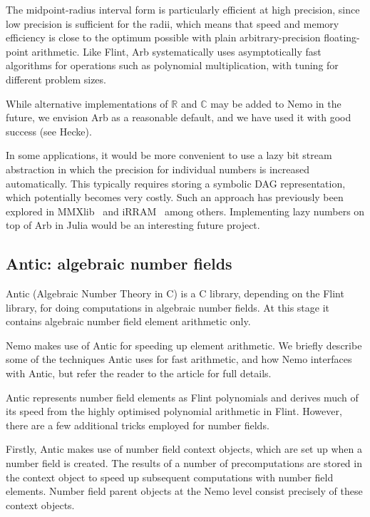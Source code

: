 \documentclass{sig-alternate-05-2015}
\begin{document}
The midpoint-radius interval form is particularly efficient
at high precision,
since low precision is sufficient for the radii, which means that
speed and memory efficiency is close to the optimum possible
with plain arbitrary-precision floating-point arithmetic.
Like Flint, Arb systematically uses asymptotically fast algorithms
for operations such as polynomial multiplication, with tuning
for different problem sizes.

While alternative implementations of $\mathbb{R}$ and $\mathbb{C}$
may be added to Nemo in the future, we envision Arb as a reasonable default,
and we have used it with good success (see Hecke).

In some applications, it would be more convenient to use a lazy
bit stream abstraction in which the precision for individual
numbers is increased automatically.
This typically requires storing a symbolic DAG representation,
which potentially becomes very costly.
Such an approach has previously been explored in MMXlib~\cite{mmxlibeffective} and iRRAM~\cite{irram}
among others.
Implementing lazy numbers on top of Arb in Julia
would be an interesting future project.

\subsection{Antic: algebraic number fields}

Antic (Algebraic Number Theory in C) is a C library, depending on the Flint library, for
doing computations in algebraic number fields. At this stage it contains algebraic number
field element arithmetic only.

Nemo makes use of Antic for speeding up element arithmetic. We briefly describe some
of the techniques Antic uses for fast arithmetic, and how Nemo interfaces with Antic, but
refer the reader to the article \cite{anticrundbrief} for full details.

Antic represents number field elements as Flint polynomials and derives much of its speed
from the highly optimised polynomial arithmetic in Flint. However, there are a few
additional tricks employed for number fields.

Firstly, Antic makes use of number field context objects, which are set up when a number
field is created. The results of a number of precomputations are stored in the context
object to speed up subsequent computations with number field elements. Number field parent
objects at the Nemo level consist precisely of these context objects.
\end{document}
